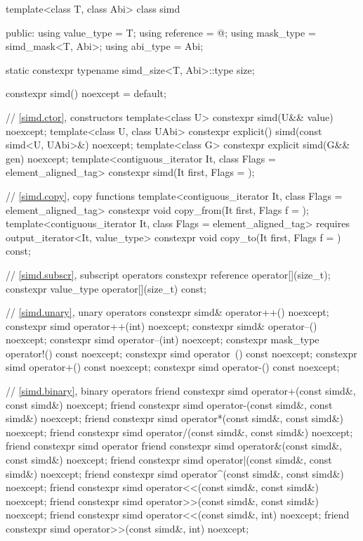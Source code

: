 \begin{codeblock}
template<class T, class Abi> class simd {
public:
  using value_type = T;
  using reference = @\seebelow@;
  using mask_type = simd_mask<T, Abi>;
  using abi_type = Abi;

  static constexpr typename simd_size<T, Abi>::type size;

  constexpr simd() noexcept = default;

  // \ref{simd.ctor},  constructors
  template<class U> constexpr simd(U&& value) noexcept;
  template<class U, class UAbi>
    constexpr explicit(\seebelow) simd(const simd<U, UAbi>&) noexcept;
  template<class G> constexpr explicit simd(G&& gen) noexcept;
  template<contiguous_iterator It, class Flags = element_aligned_tag>
    constexpr simd(It first, Flags = {});

  // \ref{simd.copy},  copy functions
  template<contiguous_iterator It, class Flags = element_aligned_tag>
    constexpr void copy_from(It first, Flags f = {});
  template<contiguous_iterator It, class Flags = element_aligned_tag>
    requires output_iterator<It, value_type>
    constexpr void copy_to(It first, Flags f = {}) const;

  // \ref{simd.subscr},  subscript operators
  constexpr reference operator[](size_t);
  constexpr value_type operator[](size_t) const;

  // \ref{simd.unary},  unary operators
  constexpr simd& operator++() noexcept;
  constexpr simd operator++(int) noexcept;
  constexpr simd& operator--() noexcept;
  constexpr simd operator--(int) noexcept;
  constexpr mask_type operator!() const noexcept;
  constexpr simd operator~() const noexcept;
  constexpr simd operator+() const noexcept;
  constexpr simd operator-() const noexcept;

  // \ref{simd.binary},  binary operators
  friend constexpr simd operator+(const simd&, const simd&) noexcept;
  friend constexpr simd operator-(const simd&, const simd&) noexcept;
  friend constexpr simd operator*(const simd&, const simd&) noexcept;
  friend constexpr simd operator/(const simd&, const simd&) noexcept;
  friend constexpr simd operator%
  friend constexpr simd operator&(const simd&, const simd&) noexcept;
  friend constexpr simd operator|(const simd&, const simd&) noexcept;
  friend constexpr simd operator^(const simd&, const simd&) noexcept;
  friend constexpr simd operator<<(const simd&, const simd&) noexcept;
  friend constexpr simd operator>>(const simd&, const simd&) noexcept;
  friend constexpr simd operator<<(const simd&, int) noexcept;
  friend constexpr simd operator>>(const simd&, int) noexcept;

}
\end{codeblock}
